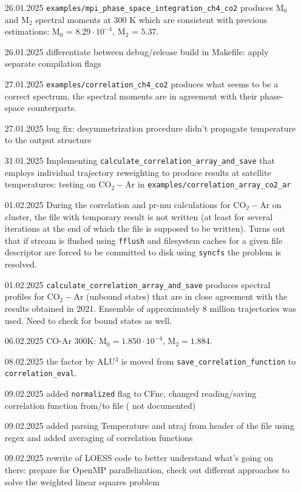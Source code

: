 \documentclass[color]{article}
\begin{document}
\begin{enumerate}
    \item [26.01.2025] \texttt{examples/mpi\_phase\_space\_integration\_ch4\_co2} produces M$_0$ and M$_2$ spectral moments at 300 K which are consistent with previous estimations: M$_0$ =  $8.29 \cdot 10^{-4}$, M$_2$ = $5.37$. 
    \item [26.01.2025] differentiate between debug/release build in Makefile: apply separate compilation flags
    \item [27.01.2025] \texttt{examples/correlation\_ch4\_co2} produces what seems to be a correct spectrum, the spectral moments are in agreement with their phase-space counterparts.
    \item [27.01.2025] bug fix: desymmetrization procedure didn't propagate temperature to the output structure
    \item [31.01.2025] Implementing \texttt{calculate\_correlation\_array\_and\_save} that employs individual trajectory reweighting to produce results at satellite temperatures: testing on CO$_2-$Ar in \texttt{examples/correlation\_array\_co2\_ar}
    \item [01.02.2025] During the correlation and pr-mu calculations for CO$_2-$Ar on cluster, the file with temporary result is not written (at least for several iterations at the end of which the file is supposed to be written). Turns out that if stream is flushed using \texttt{fflush} and filesystem caches for a given file descriptor are forced to be committed to disk using \texttt{syncfs} the problem is resolved.
    \item [01.02.2025] \texttt{calculate\_correlation\_array\_and\_save} produces spectral profiles for CO$_2-$Ar (unbound states) that are in close agreement with the results obtained in 2021. Ensemble of approximately 8 million trajectories was used. {\color{red} Need to check for bound states as well.}
    \item [06.02.2025] CO-Ar 300K: $\text{M}_0 = 1.850 \cdot 10^{-4}$, $\text{M}_2 = 1.884$. 
    \item [08.02.2025] the factor by ALU$^3$ is moved from \texttt{save\_correlation\_function} to \texttt{correlation\_eval}. 
    \item [09.02.2025] added \texttt{normalized} flag to CFnc, changed reading/saving correlation function from/to file ({\color{red} not documented})
    \item [09.02.2025] added parsing Temperature and ntraj from header of the file using regex and added averaging of correlation functions
    \item [09.02.2025] rewrite of LOESS code to better understand what's going on there: prepare for OpenMP parallelization, check out different approaches to solve the weighted linear squares problem

\end{enumerate}
\end{document}
